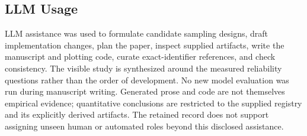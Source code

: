 \documentclass{article}
\begin{document}
\subsection{LLM Usage}
LLM assistance was used to formulate candidate sampling designs, draft implementation changes, plan the paper, inspect supplied artifacts, write the manuscript and plotting code, curate exact-identifier references, and check consistency. The visible study is synthesized around the measured reliability questions rather than the order of development. No new model evaluation was run during manuscript writing. Generated prose and code are not themselves empirical evidence; quantitative conclusions are restricted to the supplied registry and its explicitly derived artifacts. The retained record does not support assigning unseen human or automated roles beyond this disclosed assistance.
\end{document}
